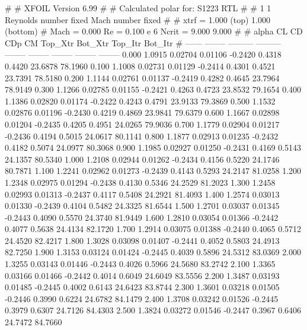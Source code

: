 #  
#       XFOIL         Version 6.99
#  
# Calculated polar for: S1223 RTL                                       
#  
# 1 1 Reynolds number fixed          Mach number fixed         
#  
# xtrf =   1.000 (top)        1.000 (bottom)  
# Mach =   0.000     Re =     0.100 e 6     Ncrit =   9.000  9.000
#  
#   alpha    CL        CD       CDp       CM     Top_Xtr  Bot_Xtr  Top_Itr  Bot_Itr
#  ------ -------- --------- --------- -------- -------- -------- -------- --------
   0.000   1.0915   0.02704   0.01106  -0.2420   0.4318   0.4420  23.6878  78.1960
   0.100   1.1008   0.02731   0.01129  -0.2414   0.4301   0.4521  23.7391  78.5180
   0.200   1.1144   0.02761   0.01137  -0.2419   0.4282   0.4645  23.7964  78.9149
   0.300   1.1266   0.02785   0.01155  -0.2421   0.4263   0.4723  23.8532  79.1654
   0.400   1.1386   0.02820   0.01174  -0.2422   0.4243   0.4791  23.9133  79.3869
   0.500   1.1532   0.02876   0.01196  -0.2430   0.4219   0.4869  23.9841  79.6379
   0.600   1.1667   0.02898   0.01204  -0.2435   0.4205   0.4951  24.0265  79.9036
   0.700   1.1779   0.02904   0.01217  -0.2436   0.4194   0.5015  24.0617  80.1141
   0.800   1.1877   0.02913   0.01235  -0.2432   0.4182   0.5074  24.0977  80.3068
   0.900   1.1985   0.02927   0.01250  -0.2431   0.4169   0.5143  24.1357  80.5340
   1.000   1.2108   0.02944   0.01262  -0.2434   0.4156   0.5220  24.1746  80.7871
   1.100   1.2241   0.02962   0.01273  -0.2439   0.4143   0.5293  24.2147  81.0258
   1.200   1.2348   0.02975   0.01294  -0.2438   0.4130   0.5346  24.2529  81.2023
   1.300   1.2458   0.02993   0.01313  -0.2437   0.4117   0.5408  24.2921  81.4093
   1.400   1.2574   0.03013   0.01330  -0.2439   0.4104   0.5482  24.3325  81.6544
   1.500   1.2701   0.03037   0.01345  -0.2443   0.4090   0.5570  24.3740  81.9449
   1.600   1.2810   0.03054   0.01366  -0.2442   0.4077   0.5638  24.4134  82.1720
   1.700   1.2914   0.03075   0.01388  -0.2440   0.4065   0.5712  24.4520  82.4217
   1.800   1.3028   0.03098   0.01407  -0.2441   0.4052   0.5803  24.4913  82.7250
   1.900   1.3153   0.03124   0.01424  -0.2445   0.4039   0.5896  24.5312  83.0369
   2.000   1.3255   0.03143   0.01446  -0.2443   0.4026   0.5966  24.5680  83.2742
   2.100   1.3365   0.03166   0.01466  -0.2442   0.4014   0.6049  24.6049  83.5556
   2.200   1.3487   0.03193   0.01485  -0.2445   0.4002   0.6143  24.6423  83.8744
   2.300   1.3601   0.03218   0.01505  -0.2446   0.3990   0.6224  24.6782  84.1479
   2.400   1.3708   0.03242   0.01526  -0.2445   0.3979   0.6307  24.7126  84.4303
   2.500   1.3824   0.03272   0.01546  -0.2447   0.3967   0.6406  24.7472  84.7660
